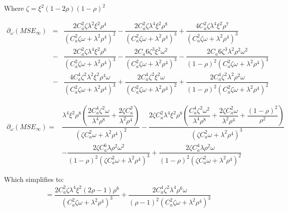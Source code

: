 \begin{subappendices}
Where $\zeta = \xi^2(1-2\rho)(1-\rho)^2$

\begin{eqnarray*}
\partial_{\omega}(MSE_{\infty})&=&\dfrac{2 C_a^2 \zeta \lambda ^2 \xi ^2 \rho ^4}{\left(C_a^2 \zeta \omega +\lambda ^2 \rho ^4\right)^2}-\dfrac{2 C_a^2 \zeta \lambda ^4 \xi ^2 \rho ^8}{\left(C_a^2 \zeta \omega +\lambda ^2 \rho ^4\right)^3}+\dfrac{4 C_a^2 \zeta \lambda ^4 \xi ^2 \rho ^7}{\left(C_a^2 \zeta \omega +\lambda ^2 \rho ^4\right)^3}\\&-&\dfrac{2 C_a^2 \zeta \lambda ^4 \xi ^2 \rho ^6}{\left(C_a^2 \zeta \omega +\lambda ^2 \rho ^4\right)^3}-\dfrac{2 C_a6 \zeta ^3 \xi ^2 \omega ^2}{\left(C_a^2 \zeta \omega +\lambda ^2 \rho ^4\right)^3}-\dfrac{2 C_a6 \zeta ^3 \lambda ^2 \rho ^2 \omega ^2}{(1-\rho )^2 \left(C_a^2 \zeta \omega +\lambda ^2 \rho ^4\right)^3}\\&-&\dfrac{4 C_a^4 \zeta ^2 \lambda ^2 \xi ^2 \rho ^4 \omega }{\left(C_a^2 \zeta \omega +\lambda ^2 \rho ^4\right)^3}+\dfrac{2 C_a^4 \zeta ^2 \xi ^2 \omega }{\left(C_a^2 \zeta \omega +\lambda ^2 \rho ^4\right)^2}+\dfrac{2 C_a^4 \zeta ^2 \lambda ^2 \rho ^2 \omega }{(1-\rho )^2 \left(C_a^2 \zeta \omega +\lambda ^2 \rho ^4\right)^2}
\end{eqnarray*}

\begin{eqnarray*}
\partial_{\omega}(MSE_{\infty})=&\dfrac{\lambda ^4 \xi ^2 \rho ^8 \left(\dfrac{2 C_a^4 \zeta ^2 \omega }{\lambda ^4 \rho ^8}+\dfrac{2 \zeta C_a^2}{\lambda ^2 \rho ^4}\right)}{\left(\zeta C_a^2 \omega +\lambda ^2 \rho ^4\right)^2}-\dfrac{2 \zeta C_a^2 \lambda ^4 \xi ^2 \rho ^8 \left(\dfrac{C_a^4 \zeta ^2 \omega ^2}{\lambda ^4 \rho ^8}+\dfrac{2 \zeta C_a^2 \omega }{\lambda ^2 \rho ^4}+\dfrac{(1-\rho )^2}{\rho ^2}\right)}{\left(\zeta C_a^2 \omega +\lambda ^2 \rho ^4\right)^3}\\&-\dfrac{2 \zeta C_a^6 \lambda \rho ^2 \omega ^2}{(1-\rho )^2 \left(\zeta C_a^2 \omega +\lambda ^2 \rho ^4\right)^3}+\dfrac{2 \zeta C_a^4 \lambda \rho ^2 \omega }{(1-\rho )^2 \left(\zeta C_a^2 \omega +\lambda ^2 \rho ^4\right)^2}
\end{eqnarray*}

Which simplifies to:
\begin{eqnarray*}
=\dfrac{2 C_a^2 \zeta \lambda ^4 \xi ^2 (2 \rho -1) \rho ^6}{\left(C_a^2 \zeta \omega +\lambda ^2 \rho ^4\right)^3}+\dfrac{2 C_a^4 \zeta ^2 \lambda ^4 \rho ^6 \omega }{(\rho -1)^2 \left(C_a^2 \zeta \omega +\lambda ^2 \rho ^4\right)^3}
\end{eqnarray*}


\end{subappendices}
